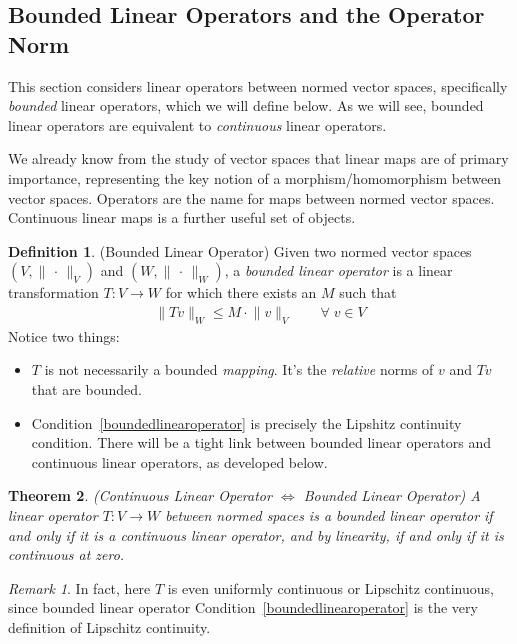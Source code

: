 \documentclass[12pt]{book}
\numberwithin{equation}{section} %
\theoremstyle{plain}
\newtheorem{thm}{Theorem}[section]
\theoremstyle{definition}
\newtheorem{defn}[thm]{Definition}
\theoremstyle{remark}
\newtheorem*{rmk}{Remark}
\newcommand{\ra}{\rightarrow}
\begin{document}
\clearpage
\subsection{Bounded Linear Operators and the Operator Norm}


This section considers linear operators between normed vector spaces,
specifically \emph{bounded} linear operators, which we will define
below.
As we will see, bounded linear operators are equivalent to
\emph{continuous} linear operators.

We already know from the study of vector spaces that linear maps are of
primary importance, representing the key notion of a
morphism/homomorphism between vector spaces.
Operators are the name for maps between normed vector spaces.
Continuous linear maps is a further useful set of objects.


\begin{defn}
({Bounded Linear Operator})
Given two normed vector spaces
$(V,\lVert\,\cdot\,\rVert_V)$
and
$(W,\lVert\,\cdot\,\rVert_W)$,
a \emph{bounded linear operator} is a linear transformation $T:V\ra W$
for which there exists an $M$ such that
\begin{align}
  \lVert Tv\rVert_W
  \leq
  M
  \cdot
  \lVert v\rVert_V
  \qquad
  \forall \; v\in V
  \label{boundedlinearoperator}
\end{align}
Notice two things:
\begin{itemize}
  \item
    $T$ is not necessarily a bounded \emph{mapping}.
    It's the \emph{relative} norms of $v$ and $Tv$ that are bounded.

  \item
    Condition~\ref{boundedlinearoperator} is precisely the Lipshitz
    continuity condition.
    There will be a tight link between bounded linear operators and
    continuous linear operators, as developed below.
\end{itemize}
\end{defn}


\begin{thm}
\label{thm:ctsboundedlinearoperator}
\emph{(Continuous Linear Operator $\iff$ Bounded Linear Operator)}
A linear operator $T:V\ra W$ between normed spaces is a \emph{bounded}
linear operator if and only if it is a \emph{continuous} linear
operator, and by linearity, if and only if it is continuous at zero.
\end{thm}
\begin{rmk}
In fact, here $T$ is even uniformly continuous or
Lipschitz continuous, since bounded linear operator
Condition~\ref{boundedlinearoperator} is the very definition of
Lipschitz continuity.
\end{rmk}
\end{document}
